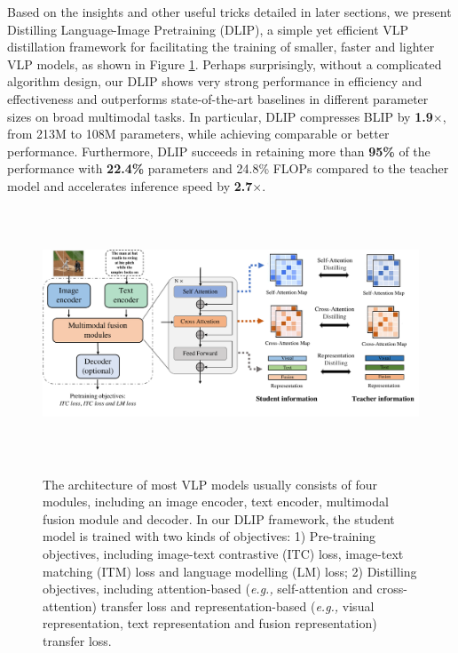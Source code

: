 \documentclass[10pt,twocolumn,letterpaper]{article}
\begin{document}
Based on the insights and other useful tricks detailed in later sections, we present Distilling Language-Image Pretraining (DLIP), a simple yet efficient VLP distillation framework for facilitating the training of smaller, faster and lighter VLP models, as shown in Figure \ref{framework}.
Perhaps surprisingly, without a complicated algorithm design, 
our DLIP shows very strong performance in efficiency and effectiveness and outperforms state-of-the-art baselines in different parameter sizes on broad multimodal tasks. 
In particular, DLIP compresses BLIP by \textbf{1.9$\times$}, from 213M to 108M parameters, while achieving comparable or better performance.
Furthermore, DLIP succeeds in retaining more than \textbf{95\%} of the performance with \textbf{22.4\%} parameters and 24.8\% FLOPs compared to the teacher model and accelerates inference speed by \textbf{2.7$\times$}.

\begin{figure}[t]
      \begin{center}
      \centerline{\includegraphics[width=170mm,height=75mm]
      {imgs/DLIP2.pdf}}
      \caption{
      The architecture of most VLP models usually consists of four modules, including an image encoder, text encoder, multimodal fusion module and decoder. In our DLIP framework, the student model is trained with two kinds of objectives: 1) Pre-training objectives, including image-text contrastive (ITC) loss, image-text matching (ITM) loss and language modelling (LM) loss; 2) Distilling objectives, including attention-based (\emph{e.g.,} self-attention and cross-attention) transfer loss and representation-based (\emph{e.g.,} visual representation, text representation and fusion representation) transfer loss.
      }
      \vspace{-3.0em}
      \label{framework}
      \end{center}
  \end{figure}
\end{document}
